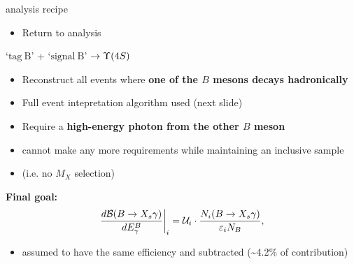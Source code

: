 \documentclass[xcolor=dvipsnames]{beamer}
\begin{document}
   \begin{frame}{\BtoXsgamma analysis recipe}
      \scriptsize\centering
      \begin{itemize}
         \item Return to \BtoXsgamma analysis
      \end{itemize}
      
      `$\mathrm{tag~B}$' + `$\mathrm{signal~B}$' $\ra \FourS$
     
      \begin{itemize}
         \item Reconstruct all events where \textbf{one of the $B$ mesons decays hadronically}
         \item[\to] Full event intepretation algorithm used (next slide)
         \item Require a \textbf{high-energy photon from the other $B$ meson}
         \item[\to] cannot make any more requirements while maintaining an inclusive sample 
         \item[] (i.e. no $M_X$ selection)
      \end{itemize}
\textbf{Final goal:}
      \begin{equation}\nonumber
         \left.\frac{d\mathcal{B}(\BtoXsgamma)}{d\EB}\right|_i = \mathcal{U}_i \cdot \frac{N_i(\BtoXsgamma)}{\varepsilon_i N_{B}},
      \end{equation}
      \begin{itemize}
         \item \BtoXdgamma assumed to have the same efficiency and subtracted (\sim 4.2\% of contribution)
      \end{itemize}
   \end{frame}
\end{document}
